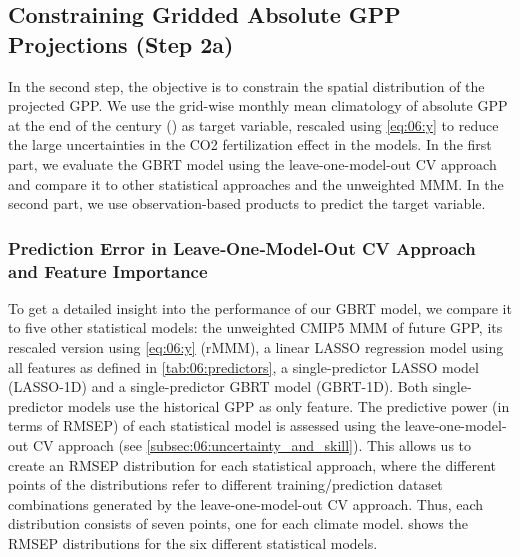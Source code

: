 \subsection{Constraining Gridded Absolute \acs{GPP} Projections (Step 2a)}
\label{subsec:06:results_step2a}

In the second step, the objective is to constrain the spatial distribution of
the projected \ac{GPP}. We use the grid-wise monthly mean climatology of
absolute \ac{GPP} at the end of the  century () as
target variable, rescaled using \cref{eq:06:y} to reduce the large
uncertainties in the \acs{CO2} fertilization effect in the models. In the first
part, we evaluate the GBRT model using the leave-one-model-out \ac{CV} approach
and compare it to other statistical approaches and the unweighted \ac{MMM}. In
the second part, we use observation-based products to predict the target
variable.


\subsubsection{Prediction Error in Leave‐One‐Model‐Out \acs{CV} Approach and
  Feature Importance}
\label{subsubsec:06:results_step2a_ml_inference}

To get a detailed insight into the performance of our \ac{GBRT} model, we
compare it to five other statistical models: the unweighted \acs{CMIP}5
\ac{MMM} of future \ac{GPP}, its rescaled version using \cref{eq:06:y}
(r\acs{MMM}), a linear \ac{LASSO} regression model using all features as
defined in \cref{tab:06:predictors}, a single-predictor \ac{LASSO} model
(\acs{LASSO}-1D) and a single-predictor \ac{GBRT} model (\acs{GBRT}-1D). Both
single-predictor models use the historical \ac{GPP} as only feature. The
predictive power (in terms of \ac{RMSEP}) of each statistical model is assessed
using the leave-one-model-out \ac{CV} approach (see
\cref{subsec:06:uncertainty_and_skill}). This allows us to create an \ac{RMSEP}
distribution for each statistical approach, where the different points of the
distributions refer to different training/prediction dataset combinations
generated by the leave-one-model-out \ac{CV} approach. Thus, each distribution
consists of seven points, one for each climate model.
 shows the \ac{RMSEP} distributions for the
six different statistical models.

